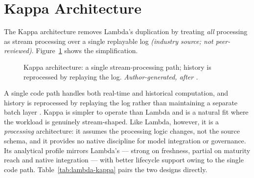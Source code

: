 \section{Kappa Architecture}
\label{sec:ch2-kappa}

The Kappa architecture removes Lambda's duplication by treating \textit{all} processing as stream processing over a single replayable log \parencite{kreps2014} \textit{(industry source; not peer-reviewed)}. Figure~\ref{fig:ch2-kappa} shows the simplification.

\begin{figure}[H]
\centering
{}
\caption{Kappa architecture: a single stream-processing path; history is reprocessed by replaying the log. \textit{Author-generated, after \parencite{kreps2014}.}}
\label{fig:ch2-kappa}
\end{figure}

A single code path handles both real-time and historical computation, and history is reprocessed by replaying the log rather than maintaining a separate batch layer \parencite{kreps2014}. Kappa is simpler to operate than Lambda and is a natural fit where the workload is genuinely stream-shaped. Like Lambda, however, it is a \textit{processing} architecture: it assumes the processing logic changes, not the source schema, and it provides no native discipline for model integration or governance. Its analytical profile mirrors Lambda's --- strong on freshness, partial on maturity reach and native integration --- with better lifecycle support owing to the single code path. Table~\ref{tab:lambda-kappa} pairs the two designs directly.

